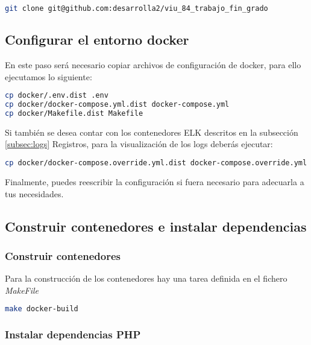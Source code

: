 \begin{lstlisting}[language=bash]
git clone git@github.com:desarrolla2/viu_84_trabajo_fin_grado
\end{lstlisting}

\subsection*{Configurar el entorno docker}\label{subsec:configurar_docker}

En este paso será necesario copiar archivos de configuración de docker, para ello ejecutamos lo siguiente:

\begin{lstlisting}[language=bash]
cp docker/.env.dist .env
cp docker/docker-compose.yml.dist docker-compose.yml
cp docker/Makefile.dist Makefile
\end{lstlisting}

Si también se desea contar con los contenedores ELK descritos en la subsección \ref{subsec:logs} Registros, para la
visualización de los logs deberás ejecutar:

\begin{lstlisting}[language=bash]
cp docker/docker-compose.override.yml.dist docker-compose.override.yml
\end{lstlisting}

Finalmente, puedes reescribir la configuración si fuera necesario para adecuarla a tus necesidades.

\subsection*{Construir contenedores e instalar dependencias}\label{subsec:construir_contenedores}

\subsubsection*{Construir contenedores}\label{subsubsec:construir_contenedores}

Para la construcción de los contenedores hay una tarea definida en el fichero \textit{MakeFile}

\begin{lstlisting}[language=bash]
make docker-build
\end{lstlisting}

\subsubsection*{Instalar dependencias PHP}\label{subsubsec:instalar_dependencias_php}

